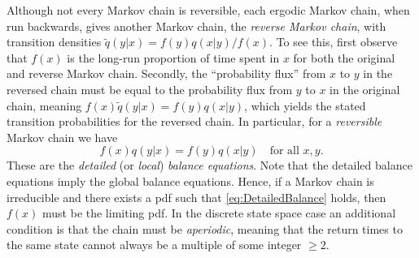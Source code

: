Although not every Markov chain is reversible, each ergodic Markov chain, when run backwards, gives another Markov chain, the \textit{reverse Markov chain}, with transition densities \(\tilde{q}(y|x) = f(y)q(x|y)/f(x)\). To see this, first observe that \(f(x)\) is the long-run proportion of time spent in \(x\) for both the original and reverse Markov chain. Secondly, the ``probability flux'' from \(x\) to \(y\) in the reversed chain must be equal to the probability flux from \(y\) to \(x\) in the original chain, meaning \(f(x)\tilde{q}(y|x) = f(y)q(x|y)\), which yields the stated transition probabilities for the reversed chain. In particular, for a \textit{reversible} Markov chain we have
\begin{equation} \label{eq:DetailedBalance}
	f(x)q(y|x) = f(y)q(x|y) \quad \text{for all } x, y.
\end{equation}
These are the \textit{detailed} (or \textit{local}) \textit{balance equations}. Note that the detailed balance equations imply the global balance equations. Hence, if a Markov chain is irreducible and there exists a pdf such that \cref{eq:DetailedBalance} holds, then \(f(x)\) must be the limiting pdf. In the discrete state space case an additional condition is that the chain must be \textit{aperiodic}, meaning that the return times to the same state cannot always be a multiple of some integer \(\ge 2\).
